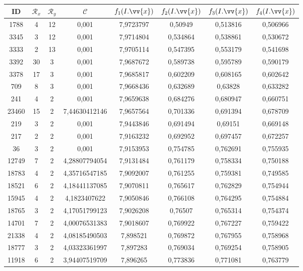 \scriptsize
\begin{longtable}{|c|c|c|c|c|c|c|c|}
\hline
ID & $\mathscr{R}_x$ & $\mathscr{R}_y$ & $\mathscr{C}$ & $f_1(I.\vv{x})$ & $f_2(I.\vv{x})$ & $f_3(I.\vv{x})$ & $f_4(I.\vv{x})$ \\
\hline
1788 & 4 & 12 & 0,001 & 7,9723797 & 0,50949 & 0,513816 & 0,506966 \\
3345 & 3 & 12 & 0,001 & 7,9714804 & 0,534864 & 0,538861 & 0,530672 \\
3333 & 2 & 13 & 0,001 & 7,9705114 & 0,547395 & 0,553179 & 0,541698 \\
3392 & 30 & 3 & 0,001 & 7,9687672 & 0,589738 & 0,595789 & 0,590179 \\
3378 & 17 & 3 & 0,001 & 7,9685817 & 0,602209 & 0,608165 & 0,602642 \\
709 & 8 & 3 & 0,001 & 7,9668436 & 0,632689 & 0,63828 & 0,633282 \\
241 & 4 & 2 & 0,001 & 7,9659638 & 0,684276 & 0,680947 & 0,660751 \\
23460 & 15 & 2 & 7,44630412146 & 7,9657564 & 0,701336 & 0,691394 & 0,678709 \\
219 & 3 & 2 & 0,001 & 7,9443846 & 0,691494 & 0,69151 & 0,669148 \\
217 & 2 & 2 & 0,001 & 7,9163232 & 0,692952 & 0,697457 & 0,672257 \\
36 & 3 & 2 & 0,001 & 7,9153953 & 0,754785 & 0,762691 & 0,755935 \\
12749 & 7 & 2 & 4,28807794054 & 7,9131484 & 0,761179 & 0,758334 & 0,750188 \\
18783 & 4 & 2 & 4,35716547185 & 7,9092007 & 0,761255 & 0,759381 & 0,749585 \\
18521 & 6 & 2 & 4,18441137085 & 7,9070811 & 0,765617 & 0,762829 & 0,754944 \\
15945 & 4 & 2 & 4,1823407622 & 7,9050846 & 0,766108 & 0,764295 & 0,754884 \\
18765 & 3 & 2 & 4,17051799123 & 7,9026208 & 0,76507 & 0,765314 & 0,754374 \\
14701 & 7 & 2 & 4,00076531383 & 7,9018607 & 0,769922 & 0,767227 & 0,759422 \\
21338 & 4 & 2 & 4,08185490503 & 7,898521 & 0,769872 & 0,767955 & 0,758968 \\
18777 & 3 & 2 & 4,03323361997 & 7,897283 & 0,769034 & 0,769254 & 0,758905 \\
11918 & 6 & 2 & 3,94407519709 & 7,896265 & 0,773836 & 0,771081 & 0,763779 \\

\end{longtable}
